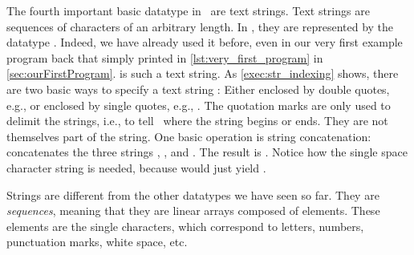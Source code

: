%
\label{sec:str}%
%
The fourth important basic datatype in \python\ are text strings.
Text strings are sequences of characters of an arbitrary length.
In \python, they are represented by the datatype .
Indeed, we have already used it before, even in our very first example program back that simply printed  in \cref{lst:very_first_program} in \cref{sec:ourFirstProgram}.
 is such a text string.%
%
%
\label{sec:strBasicOperations}%
%
%
%
%
As \cref{exec:str_indexing} shows, there are two basic ways to specify a text string :
Either enclosed by double quotes, e.g., \pythonIdx{\textquotedbl\idxdots\textquotedbl} or enclosed by single quotes, e.g., \pythonIdx{\textquotesingle\idxdots\textquotesingle}.
The quotation marks are only used to delimit the strings, i.e., to tell \python\ where the string begins or ends.
They are not themselves part of the string.%
%
%
%
One basic operation is string concatenation\pythonIdx{+}:
\pythonIdx{\textquotedbl\idxdots\textquotedbl}\pythonIdx{\textquotesingle\idxdots\textquotesingle} concatenates the three strings , , and .
The result is \pythonIdx{\textquotedbl\idxdots\textquotedbl}.
Notice how the single space character string is needed, because  would just yield .

Strings are different from the other datatypes we have seen so far.
They are \emph{sequences}, meaning that they are linear arrays composed of elements.
These elements are the single characters, which correspond to letters, numbers, punctuation marks, white space, etc.

